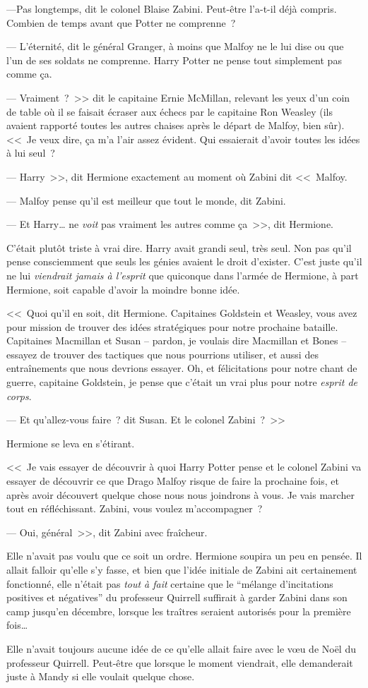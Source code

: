 ---Pas longtemps, dit le colonel Blaise Zabini. Peut-être l'a-t-il déjà compris. Combien de temps avant que Potter ne comprenne~?

--- L'éternité, dit le général Granger, à moins que Malfoy ne le lui dise ou que l'un de ses soldats ne comprenne. Harry Potter ne pense tout simplement pas comme ça.

--- Vraiment~?~>> dit le capitaine Ernie McMillan, relevant les yeux d'un coin de table où il se faisait écraser aux échecs par le capitaine Ron Weasley (ils avaient rapporté toutes les autres chaises après le départ de Malfoy, bien sûr). <<~Je veux dire, ça m'a l'air assez évident. Qui essaierait d'avoir toutes les idées à lui seul~?

--- Harry~>>, dit Hermione exactement au moment où Zabini dit <<~Malfoy.

--- Malfoy pense qu'il est meilleur que tout le monde, dit Zabini.

--- Et Harry… ne \emph{voit} pas vraiment les autres comme ça~>>, dit Hermione.

C'était plutôt triste à vrai dire. Harry avait grandi seul, très seul. Non pas qu'il pense consciemment que seuls les génies avaient le droit d'exister. C'est juste qu'il ne lui \emph{viendrait jamais à l'esprit} que quiconque dans l'armée de Hermione, à part Hermione, soit capable d'avoir la moindre bonne idée.

<<~Quoi qu'il en soit, dit Hermione. Capitaines Goldstein et Weasley, vous avez pour mission de trouver des idées stratégiques pour notre prochaine bataille. Capitaines Macmillan et Susan -- pardon, je voulais dire Macmillan et Bones -- essayez de trouver des tactiques que nous pourrions utiliser, et aussi des entraînements que nous devrions essayer. Oh, et félicitations pour notre chant de guerre, capitaine Goldstein, je pense que c'était un vrai plus pour notre \emph{esprit de corps}.

--- Et qu'allez-vous faire~? dit Susan. Et le colonel Zabini~?~>>

Hermione se leva en s'étirant.

<<~Je vais essayer de découvrir à quoi Harry Potter pense et le colonel Zabini va essayer de découvrir ce que Drago Malfoy risque de faire la prochaine fois, et après avoir découvert quelque chose nous nous joindrons à vous. Je vais marcher tout en réfléchissant. Zabini, vous voulez m'accompagner~?

--- Oui, général~>>, dit Zabini avec fraîcheur.

Elle n'avait pas voulu que ce soit un ordre. Hermione soupira un peu en pensée. Il allait falloir qu'elle s'y fasse, et bien que l'idée initiale de Zabini ait certainement fonctionné, elle n'était pas \emph{tout à fait} certaine que le “mélange d'incitations positives et négatives” du professeur Quirrell suffirait à garder Zabini dans son camp jusqu'en décembre, lorsque les traîtres seraient autorisés pour la première fois…

Elle n'avait toujours aucune idée de ce qu'elle allait faire avec le vœu de Noël du professeur Quirrell. Peut-être que lorsque le moment viendrait, elle demanderait juste à Mandy si elle voulait quelque chose.~
